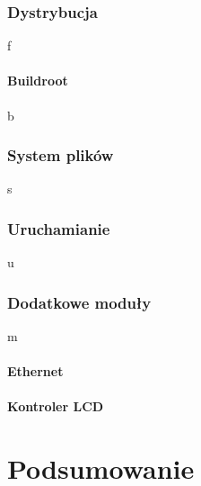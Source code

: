 \documentclass[a4paper,12pt]{book}
\begin{document}
			\subsection{Dystrybucja}
				f
				\subsubsection{Buildroot}
					b
			\subsection{System plików}
				s
			\subsection{Uruchamianie}
				u
			\subsection{Dodatkowe moduły}
				\label{sec:linux_modules}
				m
				\subsubsection{Ethernet}
				\subsubsection{Kontroler LCD}
		
	\chapter{Podsumowanie}

	
	
	
	
	
	\appendix
	
\end{document}
